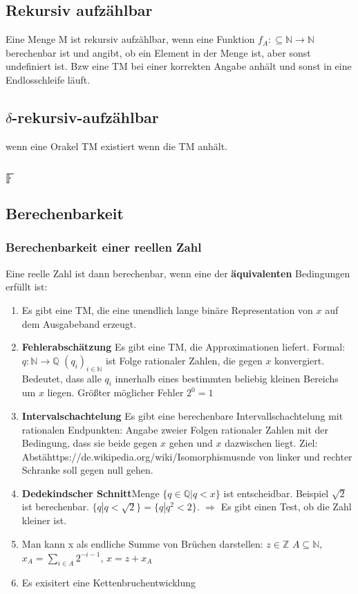 \documentclass[ngerman]{scrartcl}
\begin{document}
\subsection{Rekursiv aufzählbar} 
Eine Menge M ist rekursiv aufzählbar, wenn eine Funktion $ f_A : \subseteq \mathbb{N} \rightarrow \mathbb{N} $ berechenbar ist und angibt, ob ein Element in der Menge ist, aber sonst undefiniert ist. Bzw eine TM bei einer korrekten Angabe anhält und sonst in eine Endlosschleife läuft.

\subsection{$ \delta $-rekursiv-aufzählbar} wenn eine Orakel TM existiert wenn die TM anhält.

\subsection{$ \mathbb{F} $}

\subsection{Berechenbarkeit} 

\subsubsection{Berechenbarkeit einer reellen Zahl}
Eine reelle Zahl ist dann berechenbar, wenn eine der \textbf{äquivalenten} Bedingungen erfüllt ist:

\begin{enumerate}
  \item Es gibt eine TM, die eine unendlich lange binäre Representation von $ x $ auf dem Ausgabeband erzeugt.  
  \item \textbf{Fehlerabschätzung} Es gibt eine TM, die Approximationen liefert. Formal: $ q:\mathbb{N}\rightarrow \mathbb{Q} $ $ (q_{i})_{i \in \mathbb{N}} $ ist Folge rationaler Zahlen, die gegen $ x $ konvergiert. Bedeutet, dass alle $ q_i $ innerhalb eines bestimmten beliebig kleinen Bereichs um $ x $ liegen. Größter möglicher Fehler $ 2^0 = 1 $
  \item \textbf{Intervalschachtelung} Es gibt eine berechenbare Intervallschachtelung mit rationalen Endpunkten: Angabe zweier Folgen rationaler Zahlen mit der Bedingung, dass sie beide gegen $ x $ gehen und $ x $ dazwischen liegt. Ziel: Abstähttps://de.wikipedia.org/wiki/Isomorphismusnde von linker und rechter Schranke soll gegen null gehen.
  \item \textbf{Dedekindscher Schnitt}Menge $ \{q \in \mathbb{Q} | q < x \} $ ist entscheidbar. Beispiel $ \sqrt{2} $ ist berechenbar. $ \{ q | q < \sqrt{2} \} = \{ q | q^2 < 2\}$. $ \Rightarrow $ Es gibt einen Test, ob die Zahl kleiner ist.
  \item Man kann x als endliche Summe von Brüchen darstellen: $ z \in \mathbb{Z} $ $ A \subseteq \mathbb{N} $, $ x_A = \sum_{i \in A} 2^{-i-1} $, $ x = z + x_A $
  \item Es exisitert eine Kettenbruchentwicklung
 \end{enumerate}
\end{document}

